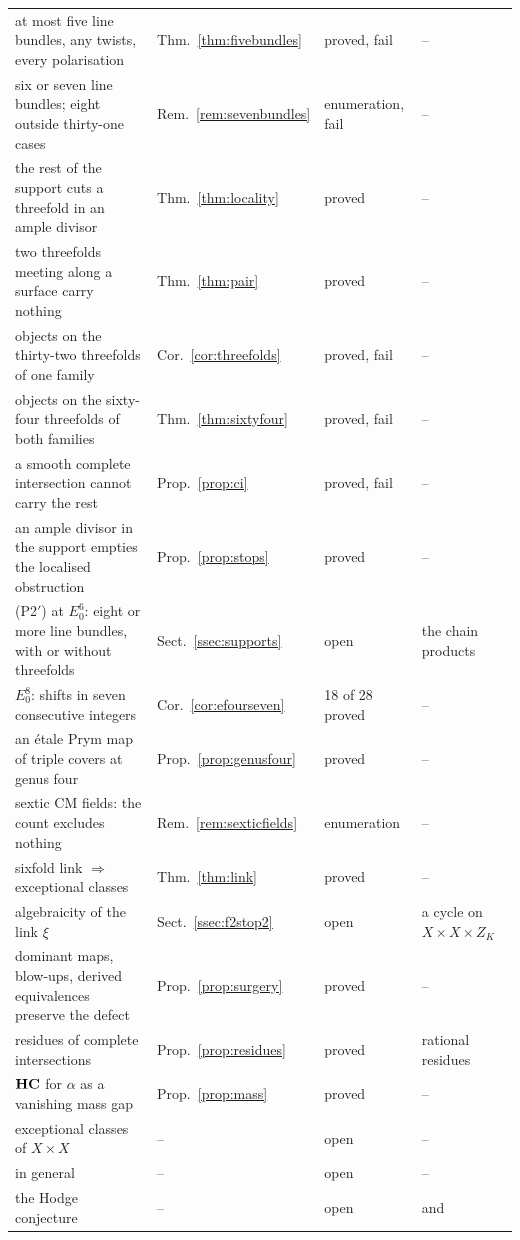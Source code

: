 \begin{table}[hbt!]
\begin{ruledtabular}
\begin{tabular}{llll}
at most five line bundles, any twists, every polarisation & Thm.~\ref{thm:fivebundles} & proved, fail & -- \\
six or seven line bundles; eight outside thirty-one cases & Rem.~\ref{rem:sevenbundles} & enumeration, fail & -- \\
the rest of the support cuts a threefold in an ample divisor & Thm.~\ref{thm:locality} & proved & -- \\
two threefolds meeting along a surface carry nothing & Thm.~\ref{thm:pair} & proved & -- \\
objects on the thirty-two threefolds of one family & Cor.~\ref{cor:threefolds} & proved, fail & -- \\
objects on the sixty-four threefolds of both families & Thm.~\ref{thm:sixtyfour} & proved, fail & -- \\
a smooth complete intersection cannot carry the rest & Prop.~\ref{prop:ci} & proved, fail & -- \\
an ample divisor in the support empties the localised obstruction & Prop.~\ref{prop:stops} & proved & -- \\
(P2$'$) at $E_{0}^{6}$: eight or more line bundles, with or without threefolds & Sect.~\ref{ssec:supports} & open & the chain products \\
$E_{0}^{8}$: shifts in seven consecutive integers & Cor.~\ref{cor:efourseven} & 18 of 28 proved & -- \\
an \'etale Prym map of triple covers at genus four & Prop.~\ref{prop:genusfour} & proved & -- \\
sextic CM fields: the count excludes nothing & Rem.~\ref{rem:sexticfields} & enumeration & -- \\
sixfold link $\Rightarrow$ exceptional classes & Thm.~\ref{thm:link} & proved & -- \\
algebraicity of the link $\xi$ & Sect.~\ref{ssec:f2stop2} & open & a cycle on $X\times X\times Z_{K}$ \\
dominant maps, blow-ups, derived equivalences preserve the defect & Prop.~\ref{prop:surgery} & proved & -- \\
residues of complete intersections & Prop.~\ref{prop:residues} & proved & rational residues \\
$\mathbf{HC}$ for $\alpha$ as a vanishing mass gap & Prop.~\ref{prop:mass} & proved & -- \\
exceptional classes of $X\times X$ & -- & open & -- \\
\Fii{} in general & -- & open & -- \\
the Hodge conjecture & -- & open & \Fii{} and \Fiii{} \\
\end{tabular}
\end{ruledtabular}
\end{table}
